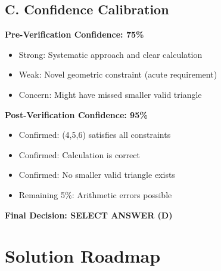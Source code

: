 \documentclass[12pt]{article}
\begin{document}
\begin{verificationbox}
\subsection*{C. Confidence Calibration}

\textbf{Pre-Verification Confidence: 75\%}
\begin{itemize}
    \item Strong: Systematic approach and clear calculation
    \item Weak: Novel geometric constraint (acute requirement)
    \item Concern: Might have missed smaller valid triangle
\end{itemize}

\textbf{Post-Verification Confidence: 95\%}
\begin{itemize}
    \item Confirmed: (4,5,6) satisfies all constraints
    \item Confirmed: Calculation is correct
    \item Confirmed: No smaller valid triangle exists
    \item Remaining 5\%: Arithmetic errors possible
\end{itemize}

\textbf{Final Decision: SELECT ANSWER (D)}

\end{verificationbox}

\section{Solution Roadmap}
\end{document}
